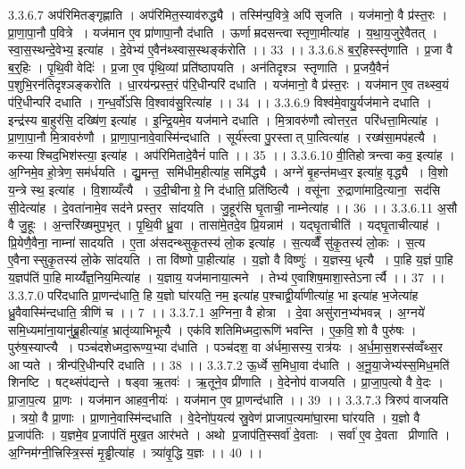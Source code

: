 3.3.6.7
अप॑रिमितङ्गृह्णाति । अप॑रिमित॒स्याव॑रुद्ध्यै । तस्मि॑न्प॒वित्रे॒ अपि॑ सृजति । यज॑मानो॒ वै प्र॑स्त॒रः । प्रा॒णा॒पा॒नौ प॒वित्रे । यज॑मान ए॒व प्रा॑णापा॒नौ द॑धाति । ऊर्णाम्रदसन्त्वा स्तृणा॒मीत्या॑ह । य॒था॒य॒जुरे॒वैतत् । स्वा॒स॒स्थन्दे॒वेभ्य॒ इत्या॑ह । दे॒वेभ्य॑ ए॒वैन॑थ्स्वास॒स्थङ्क॑रोति ।। 33 ।।
3.3.6.8
ब॒र्॒हिस्स्तृ॑णाति । प्र॒जा वै ब॒र्॒हिः । पृ॒थि॒वी वेदिः॑ । प्र॒जा ए॒व पृ॑थि॒व्यां प्रति॑ष्ठापयति । अन॑तिदृश्ञ स्तृणाति । प्र॒जयै॒वैनं॑ प॒शुभि॒रन॑तिदृश्ञङ्करोति । धा॒रय॑न्प्रस्त॒रं प॑रि॒धीन्परि॑ दधाति । यज॑मानो॒ वै प्र॑स्त॒रः । यज॑मान ए॒व तथ्स्व॒यं प॑रि॒धीन्परि॑ दधाति । ग॒न्ध॒र्वो॑ऽसि वि॒श्वाव॑सु॒रित्या॑ह ।। 34 ।।
3.3.6.9
विश्व॑मे॒वायु॒र्यज॑माने दधाति । इन्द्र॑स्य बा॒हुर॑सि॒ दख्षि॑ण॒ इत्या॑ह । इ॒न्द्रि॒यमे॒व यज॑माने दधाति । मि॒त्रावरु॑णौ त्वोत्तर॒त परि॑धत्ता॒मित्या॑ह । प्रा॒णा॒पा॒नौ मि॒त्रावरु॑णौ । प्रा॒णा॒पा॒नावे॒वास्मि॑न्दधाति । सूर्य॑स्त्वा पु॒रस्तात् पा॒त्वित्या॑ह । रख्ष॑सा॒मप॑हत्यै । कस्याश्चिद॒भिश॑स्त्या॒ इत्या॑ह । अप॑रिमितादे॒वैनं॑ पाति ।। 35 ।।
3.3.6.10
वी॒तिहोत्रन्त्वा कव॒ इत्या॑ह । अ॒ग्निमे॒व हो॒त्रेण॒ सम॑र्धयति । द्यु॒मन्त॒॒ समि॑धीम॒हीत्या॑ह॒ समि॑द्ध्यै । अग्ने॑ बृ॒हन्त॑मध्व॒र इत्या॑ह॒ वृद्ध्यै । वि॒शो य॒न्त्रे स्थ॒ इत्या॑ह । वि॒शाय्यँत्यै । उ॒दी॒चीनाग्रे॒ नि द॑धाति॒ प्रति॑ष्ठित्यै । वसू॑ना रु॒द्राणा॑मादि॒त्याना॒॒ सद॑सि सी॒देत्या॑ह । दे॒वता॑नामे॒व सद॑ने प्रस्त॒र सा॑दयति । जु॒हूर॑सि घृ॒ताची॒ नाम्नेत्या॑ह ।। 36 ।।
3.3.6.11
अ॒सौ वै जु॒हूः । अ॒न्तरि॑ख्षमुप॒भृत् । पृ॒थि॒वी ध्रु॒वा । तासा॑मे॒तदे॒व प्रि॒यन्नाम॑ । यद्घृ॒ताचीति॑ । यद्घृ॒ताचीत्याह॑ । प्रि॒येणै॒वैना॒ नाम्ना॑ सादयति । ए॒ता अ॑सदन्थ्सुकृ॒तस्य॑ लो॒क इत्या॑ह । स॒त्यव्वैँ सु॑कृ॒तस्य॑ लो॒कः । स॒त्य ए॒वैनास्सुकृ॒तस्य॑ लो॒के सा॑दयति । ता वि॑ष्णो पा॒हीत्या॑ह । य॒ज्ञो वै विष्णुः॑ । य॒ज्ञस्य॒ धृत्यै । पा॒हि य॒ज्ञं पा॒हि य॒ज्ञप॑तिं पा॒हि माय्यँ॑ज्ञ॒निय॒मित्या॑ह । य॒ज्ञाय॒ यज॑मानाया॒त्मने । तेभ्य॑ ए॒वाशिष॒माशा॒स्तेऽनार्त्यै ।। 37 ।।
3.3.7.0
परि॑दधाति प्रा॒णन्द॑धाति॒ हि य॒ज्ञो घा॑रयति॒ नम॒ इत्या॑ह प॒श्चाद्वी॒र्या॑णीत्या॑ह॒ भा इत्या॑ह भ॒जेत्या॑ह ध्रु॒वैवास्मि॑न्दधाति॒ त्रीणि॑ च ।। 7 ।।
3.3.7.1
अ॒ग्निना॒ वै होत्रा । दे॒वा असु॑रान॒भ्य॑भवन्न् । अ॒ग्नये॑ समि॒ध्यमा॑ना॒यानु॑ब्रू॒हीत्या॑ह॒ भ्रातृ॑व्याभिभूत्यै । एक॑विशतिमिध्मदा॒रूणि॑ भवन्ति । ए॒क॒वि॒॒शो वै पुरु॑षः । पुरु॑ष॒स्याप्त्यै । पञ्च॑दशेध्मदा॒रूण्य॒भ्या द॑धाति । पञ्च॑दश॒ वा अ॑र्धमा॒सस्य॒ रात्र॑यः । अ॒र्ध॒मा॒स॒शस्स॑व्वँथ्स॒र आप्यते । त्रीन्प॑रि॒धीन्परि॑ दधाति ।। 38 ।।
3.3.7.2
ऊ॒र्ध्वे स॒मिधा॒वा द॑धाति । अ॒नू॒या॒जेभ्य॑स्स॒मिध॒मति॑ शिनष्टि । षट्थ्संप॑द्यन्ते । षड्वा ऋ॒तवः॑ । ऋ॒तूने॒व प्री॑णाति । वे॒देनोप॑ वाजयति । प्रा॒जा॒प॒त्यो वै वे॒दः । प्रा॒जा॒प॒त्य प्रा॒णः । यज॑मान आहव॒नीयः॑ । यज॑मान ए॒व प्रा॒णन्द॑धाति ।। 39 ।।
3.3.7.3
त्रिरुप॑ वाजयति । त्रयो॒ वै प्रा॒णाः । प्रा॒णाने॒वास्मि॑न्दधाति । वे॒देनो॑प॒यत्य॑ स्रु॒वेण॑ प्राजाप॒त्यमा॑घा॒रमा घा॑रयति । य॒ज्ञो वै प्र॒जाप॑तिः । य॒ज्ञमे॒व प्र॒जाप॑तिं मुख॒त आर॑भते । अथो प्र॒जाप॑ति॒स्सर्वा॑ दे॒वताः । सर्वा॑ ए॒व दे॒वता प्रीणाति । अ॒ग्निम॑ग्नी॒त्त्रिस्त्रि॒स्सं मृ॒ड्ढीत्या॑ह । त्र्या॑वृ॒द्धि य॒ज्ञः ।। 40 ।।
